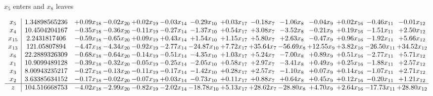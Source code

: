 \documentclass[8pt]{article}
\begin{document}
 $ x_{5} $ enters and $ x_{8} $ leaves 

 \[\begin{array}{c| c c@{\hskip 2pt} c@{\hskip 2pt} c@{\hskip 2pt} c@{\hskip 2pt} c@{\hskip 2pt} c@{\hskip 2pt} c@{\hskip 2pt} c@{\hskip 2pt} c@{\hskip 2pt} c@{\hskip 2pt} c@{\hskip 2pt} c@{\hskip 2pt} }
 x_{5}   &  1.34898565236 & +  0.09 x_{18} & -0.02 x_{20} & +  0.02 x_{19} & -0.03 x_{14} & -0.29 x_{10} & +  0.03 x_{17} & -0.18 x_{7} & -1.06 x_{8} & -0.04 x_{9} & +  0.02 x_{16} & -0.46 x_{11} & -0.01 x_{12}\\
 x_{4}   &  10.4504204167 & -0.35 x_{18} & -0.36 x_{20} & -0.11 x_{19} & -0.27 x_{14} & -1.37 x_{10} & +  0.54 x_{17} & +  3.08 x_{7} & -3.52 x_{8} & -0.21 x_{9} & +  0.19 x_{16} & -1.51 x_{11} & +  2.50 x_{12}\\
 x_{15}   &  2.2431817406 & -0.59 x_{18} & -0.65 x_{20} & +  0.09 x_{19} & +  0.43 x_{14} & +  1.54 x_{10} & +  1.15 x_{17} & +  5.80 x_{7} & +  2.63 x_{8} & -0.47 x_{9} & +  0.96 x_{16} & -1.92 x_{11} & +  5.66 x_{12}\\
 x_{13}   &  121.05807894 & -4.47 x_{18} & -4.34 x_{20} & -0.92 x_{19} & -2.77 x_{14} & -24.87 x_{10} & +  7.72 x_{17} & + 35.64 x_{7} & -56.69 x_{8} & + 12.55 x_{9} & +  3.82 x_{16} & -26.50 x_{11} & + 34.52 x_{12}\\
 x_{6}   &  22.2889326309 & -0.68 x_{18} & -0.64 x_{20} & -0.14 x_{19} & -0.51 x_{14} & -4.35 x_{10} & +  1.03 x_{17} & +  5.24 x_{7} & -7.00 x_{8} & +  0.89 x_{9} & +  0.51 x_{16} & -2.77 x_{11} & +  5.71 x_{12}\\
 x_{1}   &  10.9099489128 & -0.39 x_{18} & -0.32 x_{20} & -0.05 x_{19} & -0.25 x_{14} & -2.05 x_{10} & +  0.58 x_{17} & +  2.97 x_{7} & -3.41 x_{8} & +  0.49 x_{9} & +  0.25 x_{16} & -1.88 x_{11} & +  2.57 x_{12}\\
 x_{3}   &  8.00943235217 & -0.27 x_{18} & -0.13 x_{20} & -0.11 x_{19} & -0.17 x_{14} & -1.42 x_{10} & +  0.28 x_{17} & +  2.57 x_{7} & -1.10 x_{8} & +  0.07 x_{9} & +  0.14 x_{16} & -1.07 x_{11} & +  2.71 x_{12}\\
 x_{2}   &  3.63385634152 & -0.17 x_{18} & -0.02 x_{20} & -0.07 x_{19} & +  0.03 x_{14} & -0.73 x_{10} & +  0.11 x_{17} & +  0.88 x_{7} & +  0.64 x_{8} & +  0.45 x_{9} & +  0.12 x_{16} & -0.20 x_{11} & +  1.21 x_{12}\\
\hline
z    &  104.516668753 & -4.02 x_{18} & -2.99 x_{20} & -0.82 x_{19} & -2.02 x_{14} & -18.78 x_{10} & +  5.13 x_{17} & + 28.62 x_{7} & -28.80 x_{8} & +  4.70 x_{9} & +  2.64 x_{16} & -17.73 x_{11} & + 28.80 x_{12}\\
\end{array}\]
\end{document}
